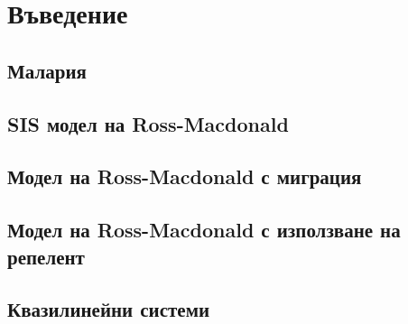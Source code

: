 \section{Въведение}
\subsection{Малария}
\subsection{SIS модел на Ross-Macdonald}
\subsection{Модел на Ross-Macdonald с миграция}
\cite{Bichara2016}
\subsection{Модел на Ross-Macdonald с използване на репелент}
\cite{Rashkov2019}
\subsection{Квазилинейни системи}
\cite{Capasso2008}

